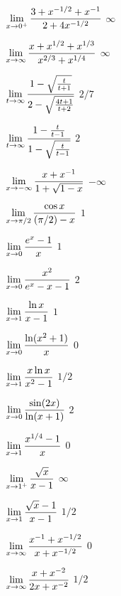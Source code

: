 \exercise $\displaystyle\lim_{x\to 0^+}{3+x^{-1/2}+x^{-1}\over 2+4x^{-1/2}}$
\answer $\infty$
\endanswer
\endexercise

\exercise $\displaystyle\lim_{x\to\infty}{x+x^{1/2}+x^{1/3}\over x^{2/3}+x^{1/4}}$
\answer $\infty$
\endanswer
\endexercise

\exercise $\displaystyle\lim_{t\to\infty}
{1-\sqrt{t\over t+1}\over 2-\sqrt{4t+1\over t+2}}$
\answer $2/7$
\endanswer
\endexercise

\exercise $\displaystyle\lim_{t\to\infty}{1-{t\over t-1}\over 1-\sqrt{t\over t-1}}$
\answer $2$
\endanswer
\endexercise

\exercise $\displaystyle\lim_{x\to-\infty}{x+x^{-1}\over 1+\sqrt{1-x}}$
\answer $-\infty$
\endanswer

\endexercise

\exercise $\displaystyle\lim_{x\to\pi/2}{\cos x\over (\pi/2)-x}$
\answer $1$
\endanswer

\iflatetranscendentals
\elselatetranscendentals
\endexercise

\exercise $\displaystyle\lim_{x\to0}{e^x-1\over x}$
\answer $1$
\endanswer
\endexercise

\exercise $\displaystyle\lim_{x\to0}{x^2\over e^x-x-1}$
\answer $2$
\endanswer
\endexercise

\exercise $\displaystyle\lim_{x\to1}{\ln x\over x-1}$
\answer $1$
\endanswer
\endexercise

\exercise $\displaystyle\lim_{x\to0}{\ln(x^2+1)\over x}$
\answer $0$
\endanswer
\endexercise

\exercise $\displaystyle\lim_{x\to1}{x\ln x\over x^2-1}$
\answer $1/2$
\endanswer
\endexercise

\exercise $\displaystyle\lim_{x\to0}{\sin(2x)\over\ln(x+1)}$
\answer $2$
\endanswer
\filatetranscendentals
\endexercise

\exercise $\displaystyle\lim_{x\to1}{x^{1/4}-1\over x}$
\answer $0$
\endanswer
\endexercise

\exercise $\displaystyle\lim_{x\to1^+}{\sqrt{x}\over x-1}$
\answer $\infty$
\endanswer
\endexercise

\exercise $\displaystyle\lim_{x\to1}{\sqrt{x}-1\over x-1}$
\answer $1/2$
\endanswer
\endexercise

\exercise $\displaystyle\lim_{x\to\infty}{x^{-1}+x^{-1/2}\over x+x^{-1/2}}$
\answer $0$
\endanswer
\endexercise

\exercise $\displaystyle\lim_{x\to\infty}{x+x^{-2}\over 2x+x^{-2}}$
\answer $1/2$
\endanswer
\endexercise

